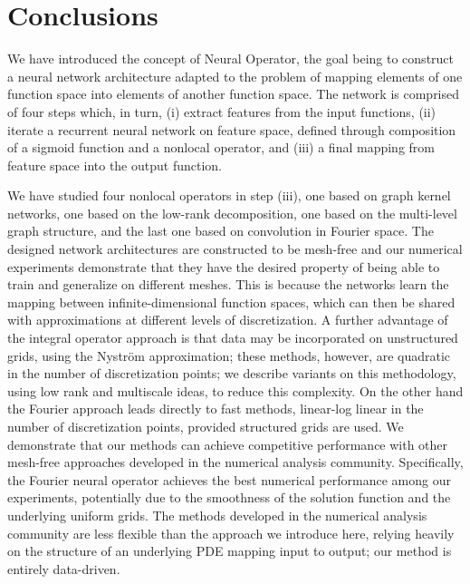 \section{Conclusions}
\label{sec:conclusion}

We have introduced the concept of Neural Operator, the goal being
to construct a neural network architecture adapted to the problem
of mapping elements of one function space into elements of
another function space. The network is comprised of four steps
which, in turn,  (i) extract  features from the input
functions, (ii) iterate a recurrent neural network on feature space, defined through composition of a sigmoid function
and a nonlocal operator, and (iii) a final mapping from feature space into the output function.

We have studied four nonlocal operators in step (iii), one based
on graph kernel networks, one based on the low-rank decomposition, one based on the multi-level graph structure, and the last one based on convolution in Fourier space.  The designed network architectures are constructed to be mesh-free and our numerical experiments demonstrate that they have the desired property of being able to train and generalize on different meshes. This is because the networks learn the mapping between infinite-dimensional function spaces, which can then be shared with approximations at different levels of discretization. A further advantage  of the integral operator approach is that data may be incorporated
on unstructured grids, using the Nystr\"om approximation; these
methods, however, are quadratic in the number of discretization points; we describe variants on this methodology, using low rank
and multiscale ideas, to reduce this complexity. On the other hand the Fourier approach leads directly  to fast methods, linear-log linear in the number of discretization points, provided structured grids are used.
We demonstrate that our methods can achieve competitive performance with other mesh-free approaches developed in the numerical analysis community. 
Specifically, the Fourier neural operator achieves the best numerical performance among our experiments, potentially due to the smoothness of the solution function and the underlying uniform grids.
The methods developed in the numerical analysis community are less flexible than the approach we introduce here, relying heavily on the structure of an underlying PDE mapping input to output; our method is entirely data-driven. 


